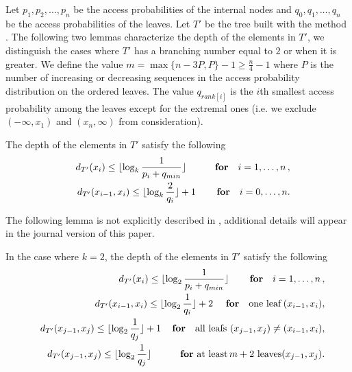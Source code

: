 \documentclass{llncs}\usepackage[english]{babel}
\begin{document}
Let $p_1,p_2,\ldots,p_n$ be the access probabilities of the internal nodes and $q_0,q_1,\dots,q_n$ be the access probabilities of the leaves. Let $T'$ be the tree built with the method \cite{nearoptbtree}. The following two lemmas characterize the depth of the elements in $T'$, we distinguish the cases where $T'$ has a branching number equal to $2$ or when it is greater. We define the value $m=\max\{n-3P,P\}-1\geq \frac{n}{4}-1$ where $P$ is the number of increasing or decreasing sequences in the access probability distribution on the ordered leaves. The value $q_{rank[i]}$ is the $i$th smallest access probability among the leaves except for the extremal ones (i.e. we exclude $(-\infty,x_1)$ and $(x_n,\infty)$ from consideration).



\begin{lemma}
\label{depthUB-Btrees}
The depth of the elements in $T'$ satisfy the following
\vspace{-0.2cm}
\begin{eqnarray*}
&&d_{T'}(x_i)\leq \lfloor \log_{k} \frac{1}{p_i+q_{min}}\rfloor \qquad \quad  {\bf for} \quad i=1,\ldots,n \, , \\
&&d_{T'}(x_{i-1},x_i)\leq \lfloor \log_{k} \frac{2}{q_i}\rfloor +1  \qquad \, {\bf for} \quad i=0,\ldots,n.
\end{eqnarray*}
\end{lemma}

The following lemma is not explicitly described in \cite{nearoptbtree}, additional details will appear in the journal version of this paper.

\begin{lemma}
\label{depthUB-BST}
In the case where $k=2$, the depth of the elements in $T'$ satisfy the following 
\vspace{-0.2cm}
\begin{eqnarray*}
&&d_{T'}(x_i)\leq \lfloor \log_{2} \frac{1}{p_i+q_{min}}\rfloor \qquad \, {\bf for} \quad i=1,\ldots,n \, , \\
&&d_{T'}(x_{i-1},x_i)\leq \lfloor \log_{2} \frac{1}{q_i}\rfloor +2  \quad\, \, {\bf for} \quad {\rm one \,\, leaf } \,(x_{i-1},x_i), \\
&&d_{T'}(x_{j-1},x_j)\leq \lfloor \log_{2} \frac{1}{q_j}\rfloor +1  \quad  \, {\bf for} \quad  {\rm all \,\, leafs} \,\,  (x_{j-1},x_j) \neq (x_{i-1},x_i), \\
&&d_{T'}(x_{j-1},x_j)\leq \lfloor \log_{2} \frac{1}{q_j}\rfloor   \quad \qquad {\bf for }\, \,{\rm at \,\, least }\, m+2 \, \,{\rm leaves} (x_{j-1},x_j).
\end{eqnarray*}
\end{lemma}
\end{document}
